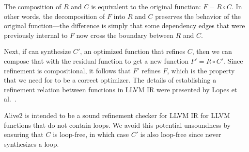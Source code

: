 The composition of $R$ and $C$ is equivalent to the original function:
$F = R \circ C$.
%
In other words, the decomposition of $F$ into $R$ and $C$ preserves
the behavior of the original function---the difference is simply that
some dependency edges that were previously internal to $F$ now cross
the boundary between $R$ and $C$.


Next, if \minotaur{} can synthesize $C'$, an optimized function that
refines $C$, then we can compose that with the residual function to
get a new function $F' = R \circ C'$.
%
Since refinement is compositional, it follows that $F'$ refines $F$,
which is the property that we need for \minotaur{} to be a correct
optimizer.
%
The details of establishing a refinement relation between functions in
LLVM IR were presented by Lopes et al.~\cite{alive2}.


Alive2 is intended to be a sound refinement checker for LLVM
IR for LLVM functions that do not contain loops.
%
We avoid this potential unsoundness by ensuring that $C$ is loop-free,
in which case $C'$ is also loop-free since \minotaur{} never synthesizes a
loop.



